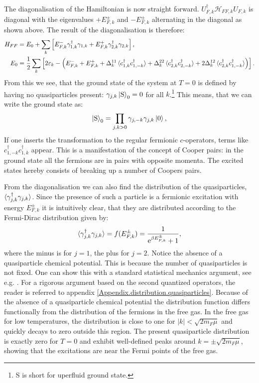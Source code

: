 The diagonalisation of the Hamiltonian is now straight forward. $U^\dagger_{F,k}\mathcal{H}_{FF,k}U_{F,k}$ is diagonal with the eigenvalues $+E^{\pm}_{F,k}$ and $-E^{\pm}_{F,k}$ alternating in the diagonal as shown above. The result of the diagonalisation is therefore:
\begin{align}
H_{FF} &= E_0 + \sum_{k} \left[ E^{-}_{F,k}\gamma^\dagger_{1, k}\gamma_{1, k} + E^{+}_{F,k}\gamma^\dagger_{2, k}\gamma_{2, k} \right], \nonumber \\ 
E_0 &= \frac{1}{2}\sum_k \left[2\varepsilon_k - \left( E^{-}_{F,k} + E^{+}_{F,k} + \Delta^{11}_k\braket{c^\dagger_{1,k}c^\dagger_{1,-k}} + \Delta^{22}_k\braket{c^\dagger_{2,k}c^\dagger_{2,-k}} + 2\Delta^{12}_k\braket{c^\dagger_{2,k}c^\dagger_{1,-k}} \right) \right]. 
\label{eq.2wiresDiagonalisedHamiltonian}
\end{align}  
From this we see, that the ground state of the system at $T = 0$ is defined by having no quasiparticles present: $\gamma_{j,k} \ket{\text{S}}_0 = 0$ for all $k$.\footnote{S is short for uperfluid ground state.} This means, that we can write the ground state as:
\begin{equation}
\ket{\text{S}}_0 = \prod_{j,k > 0} \gamma_{j,-k}\gamma_{j,k}\ket{0},
\label{eq.superfluidgroundstate}
\end{equation}
If one inserts the transformation to the regular fermionic $c$-operators, terms like $c^\dagger_{1,-k}c^\dagger_{1,k}$ appear. This is a manifestation of the concept of Cooper pairs: in the ground state all the fermions are in pairs with opposite momenta. The excited states hereby consists of breaking up a number of Coopers pairs.   

From the diagonalisation we can also find the distribution of the quasiparticles, $\braket{\gamma^\dagger_{j,k}\gamma_{j,k}}$. Since the presence of such a particle is a fermionic excitation with energy $E^{\pm}_{F,k}$ it is intuitively clear, that they are distributed according to the Fermi-Dirac distribution given by:
\begin{equation}
\braket{\gamma^\dagger_{j,k} \gamma_{j,k}} = f(E^{\pm}_{F,k}) = \frac{1}{\text{e}^{\beta E^{\pm}_{F,k}} + 1}, 
\label{eq.Distribution.quasiparticles}
\end{equation}
where the minus is for $j = 1$, the plus for $j = 2$. Notice the absence of a quasiparticle chemical potential. This is because the number of quasiparticles is not fixed. One can show this with a standard statistical mechanics argument, see e.g. \cite[p. 225]{SchroederThermal}. For a rigorous argument based on the second quantized operators, the reader is referred to appendix \ref{Appendix.distribution.quasiparticles}. Because of the absence of a quasiparticle chemical potential the distribution function differs functionally from the distribution of the fermions in the free gas. In the free gas for low temperatures, the distribution is close to one for $|k|< \sqrt{2m_F\mu}$ and quickly decays to zero outside this region. The present quasiparticle distribution is exactly zero for $T = 0$ and exhibit well-defined peaks around $k = \pm \sqrt{2m_F\mu}$, showing that the excitations are near the Fermi points of the free gas. 

